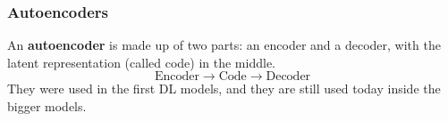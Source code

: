 \begin{frame}
    \frametitle{Autoencoders}
    An \textbf{autoencoder} is made up of two parts: an encoder and a decoder, with the latent representation (called code) in the middle.
    $$\text{Encoder} \to \text{Code} \to \text{Decoder}$$
    They were used in the first DL models, and they are still used today inside the bigger models.
\end{frame}